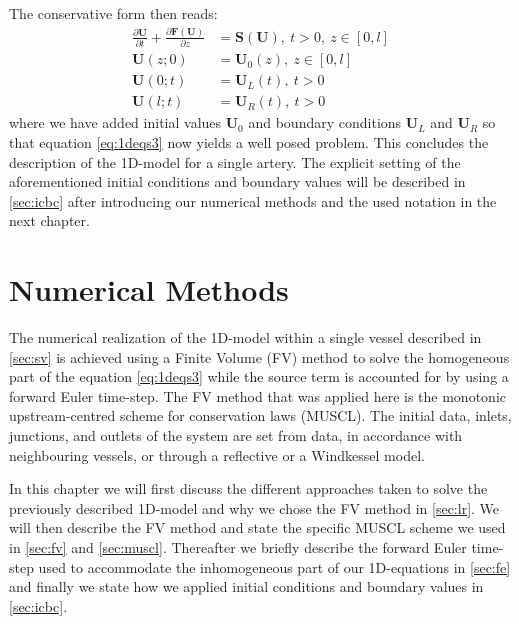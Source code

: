 \documentclass[a4paper, oneside]{discothesis}
\begin{document}
The conservative form then reads:
\begin{equation}
	\begin{aligned}
		\frac{\partial \mathbf{U}}{\partial t} + \frac{\partial \mathbf{F} \left( \mathbf{U} \right)}{\partial z} &= \mathbf{S} \left( \mathbf{U} \right), \ t>0, \ z \in \left[ 0,l \right] \\
		\mathbf{U} \left( z;0 \right) &= \mathbf{U}_0 \left( z \right), \ z \in \left[ 0,l \right] \\
		\mathbf{U} \left( 0;t \right) &= \mathbf{U}_L \left( t \right), \ t>0\\
		\mathbf{U} \left( l;t \right) &= \mathbf{U}_R \left( t \right), \ t>0
	\end{aligned} \label{eq:1deqs3}
\end{equation}
where we have added initial values $\mathbf{U}_0$ and boundary conditions $\mathbf{U}_L$ and $\mathbf{U}_R$ so that equation \ref{eq:1deqs3} now yields a well posed problem.\cite{formaggia2010cardiovascular}
This concludes the description of the 1D-model for a single artery.
The explicit setting of the aforementioned initial conditions and boundary values will be described in \autoref{sec:icbc} after introducing our numerical methods and the used notation in the next chapter.





\chapter{Numerical Methods} \label{chap:nm}
The numerical realization of the 1D-model within a single vessel described in \autoref{sec:sv} is achieved using a Finite Volume (FV) method to solve the homogeneous part of the equation \autoref{eq:1deqs3} while the source term is accounted for by using a forward Euler time-step. 
The FV method that was applied here is the monotonic upstream-centred scheme for conservation laws (MUSCL).
The initial data, inlets, junctions, and outlets of the system are set from data, in accordance with neighbouring vessels, or through a reflective or a Windkessel model.

In this chapter we will first discuss the different approaches taken to solve the previously described 1D-model and why we chose the FV method in \autoref{sec:lr}.
We will then describe the FV method and state the specific MUSCL scheme we used in \autoref{sec:fv} and \autoref{sec:muscl}.
Thereafter we briefly describe the forward Euler time-step used to accommodate the inhomogeneous part of our 1D-equations in \autoref{sec:fe} and finally we state how we applied initial conditions and boundary values in \autoref{sec:icbc}.
\end{document}
